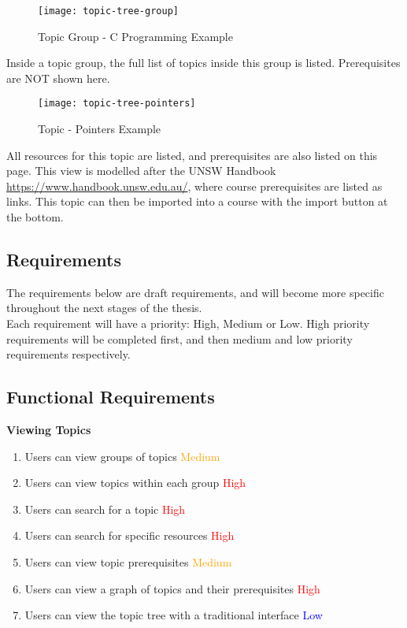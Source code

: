 \begin{figure}[h!]
    \centering
    \texttt{[image: topic-tree-group]}
    \caption{Topic Group - C Programming Example}
\end{figure}

Inside a topic group, the full list of topics inside this group is listed. Prerequisites are NOT shown here. \\

\begin{figure}[h!]
    \centering
    \texttt{[image: topic-tree-pointers]}
    \caption{Topic - Pointers Example}
\end{figure}

All resources for this topic are listed, and prerequisites are also listed on this page. This view is modelled after the UNSW Handbook \url{https://www.handbook.unsw.edu.au/}, where course prerequisites are listed as links. This topic can then be imported into a course with the import button at the bottom.\\

\subsection{Requirements}
The requirements below are draft requirements, and will become more specific throughout the next stages of the thesis.\\
Each requirement will have a priority: High, Medium or Low. High priority requirements will be completed first, and then medium and low priority requirements respectively. \\

\subsection{Functional Requirements}

\textbf{Viewing Topics}

    \begin{enumerate}
    \item Users can view groups of topics \textcolor{Orange}{Medium}
    \item Users can view topics within each group \textcolor{Red}{High}
    \item Users can search for a topic \textcolor{Red}{High}
    \item Users can search for specific resources \textcolor{Red}{High}
    \item Users can view topic prerequisites \textcolor{Orange}{Medium}
    \item Users can view a graph of topics and their prerequisites \textcolor{Red}{High}
    \item Users can view the topic tree with a traditional interface \textcolor{Blue}{Low}
    \end{enumerate}


